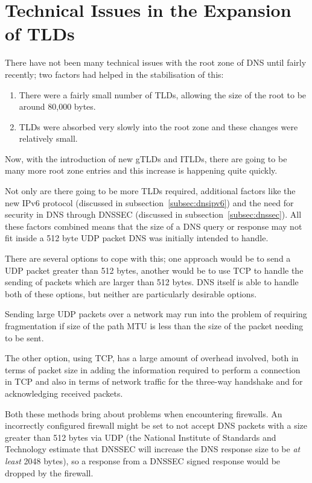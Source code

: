 \documentclass[11pt, a4paper]{article}
\begin{document}
\newpage
\section{Technical Issues in the Expansion of TLDs}

There have not been many technical issues with the root zone of \gls{DNS} until
fairly recently; two factors had helped in the stabilisation of 
this\cite{manning2011challenges}:

\begin{enumerate}
\item There were a fairly small number of \glspl{TLD}, allowing the size of the
      root to be around 80,000 bytes.
\item \glspl{TLD} were absorbed very slowly into the root zone and these
      changes were relatively small.
\end{enumerate}

Now, with the introduction of new \glspl{gTLD} and \glspl{ITLD}, there are 
going to be many more root zone entries and this increase is happening quite
quickly.

Not only are there going to be more \glspl{TLD} required, additional factors
like the new IPv6 protocol (discussed in subsection~\ref{subsec:dnsipv6}) and 
the need for security in \gls{DNS} through \gls{DNSSEC}\cite{rfc2535} 
(discussed in subsection~\ref{subsec:dnssec}). All these factors combined means
that the size of a \gls{DNS} query or response may not fit inside a 512 byte 
\gls{UDP} packet \gls{DNS} was initially intended to handle.

There are several options to cope with this; one approach would be to send a
\gls{UDP} packet greater than 512 bytes, another would be to use \gls{TCP} to
handle the sending of packets which are larger than 512 bytes. \gls{DNS} itself
is able to handle both of these options, but neither are particularly desirable
options.

Sending large \gls{UDP} packets over a network may run into the problem of 
requiring fragmentation if size of the path \gls{MTU} is less than the size of
the packet needing to be sent.

The other option, using \gls{TCP}, has a large amount of overhead involved, 
both in terms of packet size in adding the information required to perform a
connection in \gls{TCP} and also in terms of network traffic for the three-way 
handshake and for acknowledging received packets.

Both these methods bring about problems when encountering firewalls. An 
incorrectly configured firewall might be set to not accept \gls{DNS} packets
with a size greater than 512 bytes via \gls{UDP} (the National Institute of Standards and 
Technology estimate that \gls{DNSSEC} will increase the \gls{DNS} response size
to be \textit{at least} 2048 bytes), so a response from a \gls{DNSSEC} signed 
response would be dropped by the firewall.
\end{document}
